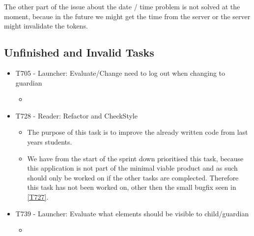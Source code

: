 The other part of the issue about the date / time problem is not solved at the
moment, becaue in the future we might get the time from the server or the server
might invalidate the tokens.


\subsection{Unfinished and Invalid Tasks}
\begin{itemize}
  \item T705 - Launcher: Evaluate/Change need to log out when changing  to
  guardian
  \begin{itemize}
  	\item 
  \end{itemize}
  \item T728 - Reader: Refactor and CheckStyle
    \begin{itemize}
  	\item The purpose of this task is to improve the already written code from
  	last years students. 
  	\item We have from the start of the sprint down prioritised this task,
  	because this application is not part of the minimal viable product and as
  	such should only be worked on if the other tasks are complected. Therefore
  	this task has not been worked on, other then the small bugfix seen in
  	\autoref{T727}.
  \end{itemize}
  \item T739 - Launcher: Evaluate what elements should be visible to
child/guardian
  \begin{itemize}
  	\item 
  \end{itemize}
\end{itemize}





















